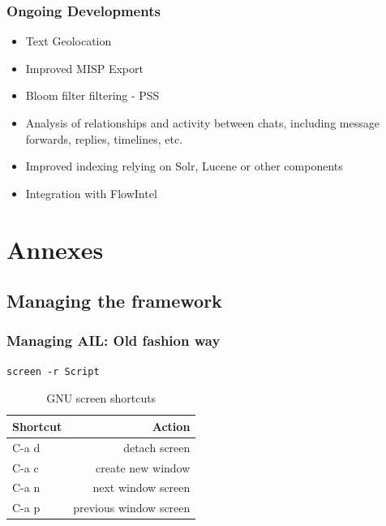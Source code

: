 \documentclass[10pt,aspectratio=169, colorlinks=true, linkcolor=circlBlue]{beamer}
\begin{document}
\begin{frame}
    \frametitle{Ongoing Developments}
        \begin{itemize}
            \item Text Geolocation
            \item Improved MISP Export
            \item Bloom filter filtering - PSS
            \item Analysis of relationships and activity between chats, including message forwards, replies, timelines, etc.
            \item Improved indexing relying on Solr, Lucene or other components
            \item Integration with FlowIntel
        \end{itemize}
\end{frame}




\section{Annexes}


\subsection{Managing the framework}

\begin{frame}[fragile]
    \frametitle{Managing AIL: Old fashion way}

    \begin{tcolorbox}[colback=black!85, coltext=green, title=Access the script screen, fonttitle=\bfseries]
\begin{verbatim}
screen -r Script
\end{verbatim}
    \end{tcolorbox}

    \begin{table}
        \caption{GNU screen shortcuts}
        \begin{tabular}{|l|r|}
            \hline
            \textbf{Shortcut} & \textbf{Action} \\
            \hline
            C-a d & detach screen \\
            \hline
            C-a c & create new window \\
            \hline
            C-a n & next window screen \\
            \hline
            C-a p & previous window screen \\
            \hline
        \end{tabular}
    \end{table}
\end{frame}
\end{document}
